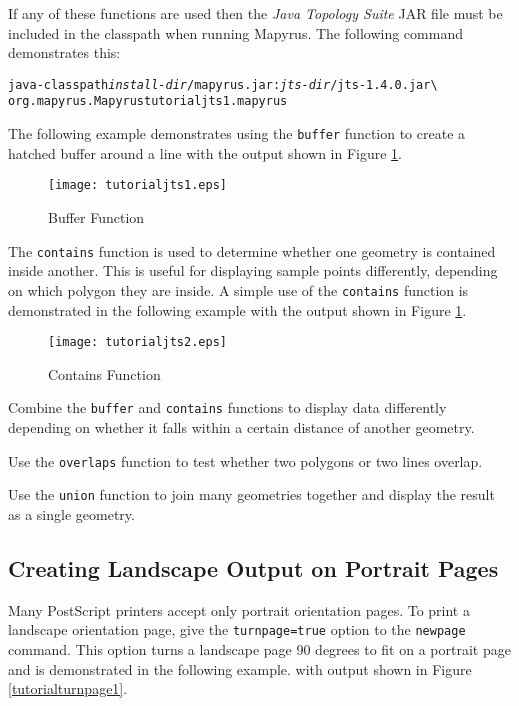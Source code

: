 If any of these functions are used then the
\textit{Java Topology Suite} JAR file must be included in the
classpath when running Mapyrus.  The following command demonstrates this:

\begin{alltt}
java -classpath \textit{install-dir}/mapyrus.jar:\textit{jts-dir}/jts-1.4.0.jar \textbackslash
  org.mapyrus.Mapyrus tutorialjts1.mapyrus
\end{alltt}

The following example demonstrates using the \texttt{buffer} function to
create a hatched buffer around a line
with the output shown in Figure \ref{tutorialjts1}.



\begin{figure}[htb]
\texttt{[image: tutorialjts1.eps]}
\caption{Buffer Function}
\label{tutorialjts1}
\end{figure}

The \texttt{contains} function is used to determine whether one geometry
is contained inside another.  This is useful for displaying sample points
differently, depending on which polygon they are inside.
A simple use of the \texttt{contains} function is
demonstrated in the following example
with the output shown in Figure \ref{tutorialjts1}.



\begin{figure}[htb]
\texttt{[image: tutorialjts2.eps]}
\caption{Contains Function}
\label{tutorialjts2}
\end{figure}

Combine the \texttt{buffer} and \texttt{contains} functions to
display data differently depending on whether it falls within
a certain distance of another geometry.

Use the \texttt{overlaps} function to test whether two
polygons or two lines overlap.

Use the \texttt{union} function to join many geometries together
and display the result as a single geometry.

\subsection{Creating Landscape Output on Portrait Pages}

Many PostScript printers accept only portrait orientation pages.
To print a landscape orientation page, 
give the \texttt{turnpage=true} option to the \texttt{newpage} command.
This option turns a landscape page 90 degrees to fit on a portrait page
and is demonstrated in the following example.
with output shown in Figure \ref{tutorialturnpage1}.

